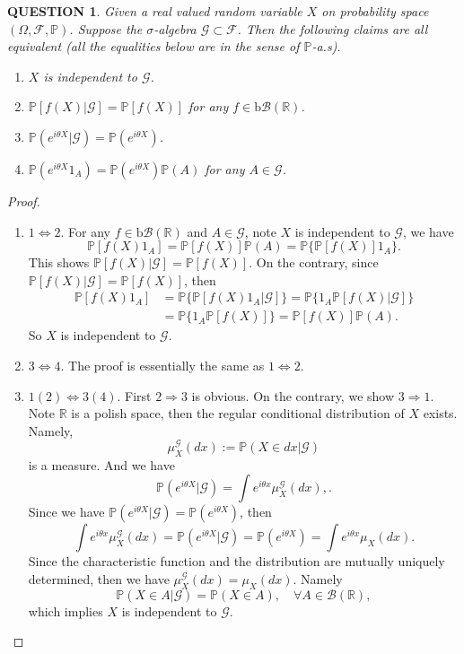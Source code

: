 \documentclass[12pt]{article}
\renewcommand{\b}{\mathscr{B}}
\renewcommand{\(}{\left(}%
\renewcommand{\)}{\right)}%
\renewcommand{\[}{\left[}%
\renewcommand{\]}{\right]}%
\renewcommand{\r}{\mathbb{R}}
\newcommand{\p}{\mathbb{P}}
\newcommand{\f}{\mathscr{F}}
\newcommand{\g}{\mathscr{G}}
\newtheorem{question}{QUESTION}[section]}
\newtheorem{proof}{Proof.}}
\begin{document}
  \begin{question}
  	Given a real valued random variable $X$ on probability space $(\Omega,\f,\p)$. Suppose the $\sigma$-algebra $\g\subset \f$. Then the following claims are all equivalent (all the equalities below are in the sense of $\p$-a.s).
  	\begin{enumerate}
  		\item $X$ is independent to $\g$.
  		\item $\p[f(X)|\g]=\p[f(X)]$ for any $f\in\mathrm{b}\b(\r)$.
  		\item $\p(e^{i\theta X}|\g)=\p(e^{i\theta X})$.
  		\item $\p(e^{i\theta X}1_A)=\p(e^{i\theta X})\p(A)$ for any $A\in\g$.
  	\end{enumerate}
  \end{question}
  \begin{proof}
  	\begin{enumerate}
  		\item $1\Leftrightarrow 2$. For any $f\in\mathrm{b}\b(\r)$ and $A\in\g$, note $X$ is independent to $\g$, we have 
  		\begin{equation*}
  			\p[f(X)1_A]=\p[f(X)]\p(A)=\p\{\p[f(X)]1_A\}.
  		\end{equation*}
  		This shows $\p[f(X)|\g]=\p[f(X)]$. On the contrary, since $\p[f(X)|\g]=\p[f(X)]$, then 
  		\begin{equation*}
  			\begin{split}
  				\p[f(X)1_A]&=\p\{\p[f(X)1_A|\g]\}=\p\{1_A\p[f(X)|\g]\}\\
  				&=\p\{1_A\p[f(X)]\}=\p[f(X)]\p(A).
  			\end{split}
  		\end{equation*}
  		So $X$ is independent to $\g$.
  		\item $3\Leftrightarrow 4$. The proof is essentially the same as $1\Leftrightarrow 2$.
  		\item $1(2)\Leftrightarrow 3(4)$. First $2\Longrightarrow 3$ is obvious. On the contrary, we show $3\Rightarrow 1$. Note $\r$ is a polish space, then the regular conditional distribution of $X$ exists. Namely, 
  		\begin{equation*}
  			\mu_X^\g(dx):=\p(X\in dx|\g)
  		\end{equation*}
  		is a measure. And we have
  		\begin{equation*}
  			\p(e^{i\theta X}|\g)=\int e^{i\theta x} \mu_X^\g(dx),.
  		\end{equation*}
  		Since we have $\p(e^{i\theta X}|\g)=\p(e^{i\theta X})$, then
  		\begin{equation*}
  			\int e^{i\theta x} \mu_X^\g(dx)=\p(e^{i\theta X}|\g)=\p(e^{i\theta X})=\int e^{i\theta x} \mu_X(dx).
  		\end{equation*}
  		Since the characteristic function and the distribution are mutually uniquely determined, then we have $\mu_X^\g(dx)=\mu_X(dx)$. Namely 
  		\begin{equation*}
  			\p(X\in A|\g)=\p(X\in A),\quad \forall A\in\b(\r),
  		\end{equation*}
  		which implies $X$ is independent to $\g$.
  	\end{enumerate}
  \end{proof}
  
\end{document}
